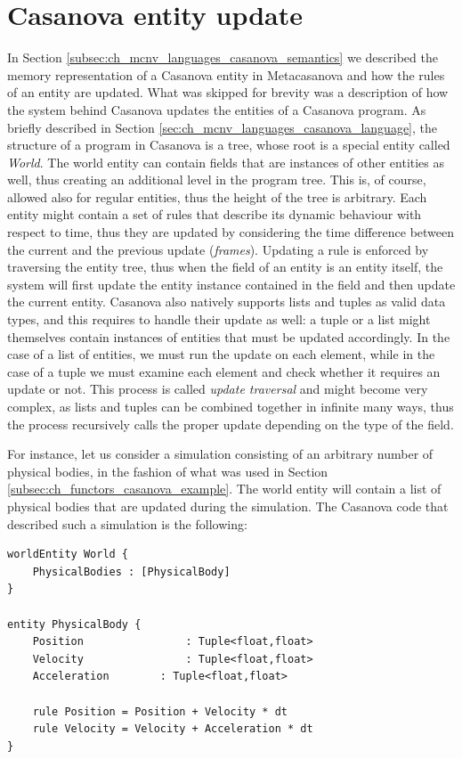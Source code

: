 \section{Casanova entity update}
\label{subsec:ch_networking_casanova_update}
In Section \ref{subsec:ch_mcnv_languages_casanova_semantics} we described the memory representation of a Casanova entity in Metacasanova and how the rules of an entity are updated. What was skipped for brevity was a description of how the system behind Casanova updates the entities of a Casanova program. As briefly described in Section \ref{sec:ch_mcnv_languages_casanova_language}, the structure of a program in Casanova is a tree, whose root is a special entity called \textit{World}. The world entity can contain fields that are instances of other entities as well, thus creating an additional level in the program tree. This is, of course, allowed also for regular entities, thus the height of the tree is arbitrary. Each entity might contain a set of rules that describe its dynamic behaviour with respect to time, thus they are updated by considering the time difference between the current and the previous update (\textit{frames}). Updating a rule is enforced by traversing the entity tree, thus when the field of an entity is an entity itself, the system will first update the entity instance contained in the field and then update the current entity. Casanova also natively supports lists and tuples as valid data types, and this requires to handle their update as well: a tuple or a list might themselves contain instances of entities that must be updated accordingly. In the case of a list of entities, we must run the update on each element, while in the case of a tuple we must examine each element and check whether it requires an update or not. This process is called \textit{update traversal} and might become very complex, as lists and tuples can be combined together in infinite many ways, thus the process recursively calls the proper update depending on the type of the field.

For instance, let us consider a simulation consisting of an arbitrary number of physical bodies, in the fashion of what was used in Section \ref{subsec:ch_functors_casanova_example}. The world entity will contain a list of physical bodies that are updated during the simulation. The Casanova code that described such a simulation is the following:

\begin{lstlisting}
worldEntity World {
	PhysicalBodies : [PhysicalBody]
}

entity PhysicalBody {
	Position				: Tuple<float,float>
	Velocity				: Tuple<float,float>
	Acceleration		: Tuple<float,float>
	
	rule Position = Position + Velocity * dt
	rule Velocity = Velocity + Acceleration * dt
}
\end{lstlisting}

